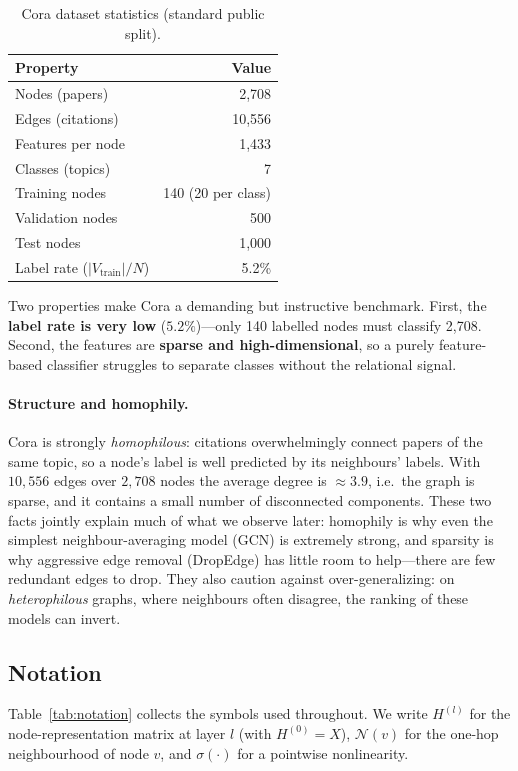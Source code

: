 \documentclass{article}
\begin{document}
\begin{table}[h]
  \centering
  \caption{Cora dataset statistics (standard public split).}
  \label{tab:dataset}
  \begin{tabular}{lr}
    \toprule
    Property & Value \\
    \midrule
    Nodes (papers)            & 2{,}708 \\
    Edges (citations)         & 10{,}556 \\
    Features per node         & 1{,}433 \\
    Classes (topics)          & 7 \\
    Training nodes            & 140 (20 per class) \\
    Validation nodes          & 500 \\
    Test nodes                & 1{,}000 \\
    Label rate ($|V_{\text{train}}|/N$) & 5.2\% \\
    \bottomrule
  \end{tabular}
\end{table}

Two properties make Cora a demanding but instructive benchmark. First, the
\textbf{label rate is very low} ($5.2\%$)---only 140 labelled nodes must classify
2{,}708. Second, the features are \textbf{sparse and high-dimensional}, so a purely
feature-based classifier struggles to separate classes without the relational signal.

\paragraph{Structure and homophily.} Cora is strongly \emph{homophilous}: citations
overwhelmingly connect papers of the same topic, so a node's label is well predicted by
its neighbours' labels. With $10{,}556$ edges over $2{,}708$ nodes the average degree is
$\approx 3.9$, i.e.\ the graph is sparse, and it contains a small number of disconnected
components. These two facts jointly explain much of what we observe later: homophily is
why even the simplest neighbour-averaging model (GCN) is extremely strong, and sparsity
is why aggressive edge removal (DropEdge) has little room to help---there are few
redundant edges to drop. They also caution against over-generalizing: on
\emph{heterophilous} graphs, where neighbours often disagree, the ranking of these
models can invert.

\subsection{Notation}
Table~\ref{tab:notation} collects the symbols used throughout. We write $H^{(l)}$ for
the node-representation matrix at layer $l$ (with $H^{(0)} = X$), $\mathcal{N}(v)$ for
the one-hop neighbourhood of node $v$, and $\sigma(\cdot)$ for a pointwise
nonlinearity.
\end{document}
